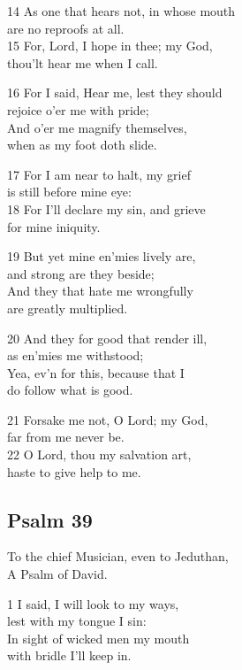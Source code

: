 \begin{multicols}{3}
14 As one that hears not, in whose mouth\\
are no reproofs at all.\\
15 For, Lord, I hope in thee; my God,\\
thou’lt hear me when I call.

16 For I said, Hear me, lest they should\\
rejoice o’er me with pride;\\
And o’er me magnify themselves,\\
when as my foot doth slide.

17 For I am near to halt, my grief\\
is still before mine eye:\\
18 For I’ll declare my sin, and grieve\\
for mine iniquity.

19 But yet mine en’mies lively are,\\
and strong are they beside;\\
And they that hate me wrongfully\\
are greatly multiplied.

20 And they for good that render ill,\\
as en’mies me withstood;\\
Yea, ev’n for this, because that I\\
do follow what is good.

21 Forsake me not, O Lord; my God,\\
far from me never be.\\
22 O Lord, thou my salvation art,\\
haste to give help to me.

\begin{center}
\quad{}\quad{}
\end{center}

\subsection*{Psalm 39}

To the chief Musician, even to Jeduthan,\\
A Psalm of David.

1 I said, I will look to my ways,\\
lest with my tongue I sin:\\
In sight of wicked men my mouth\\
with bridle I’ll keep in.


\end{multicols}
